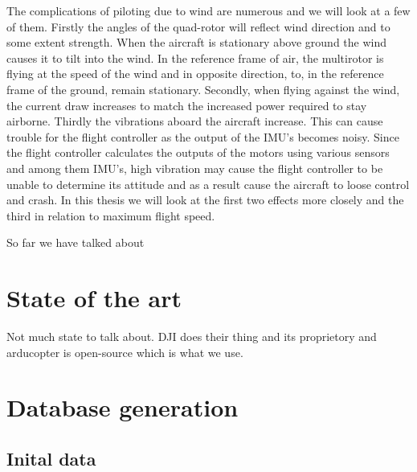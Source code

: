 \documentclass[12pt,oneside]{reedthesis}
\theoremstyle{definition}
\theoremstyle{definition}
\theoremstyle{definition}
\theoremstyle{remark}
\begin{document}
The complications of piloting due to wind are numerous and we will look
at a few of them. Firstly the angles of the quad-rotor will reflect wind
direction and to some extent strength. When the aircraft is stationary
above ground the wind causes it to tilt into the wind. In the reference
frame of air, the multirotor is flying at the speed of the wind and in
opposite direction, to, in the reference frame of the ground, remain
stationary. Secondly, when flying against the wind, the current draw
increases to match the increased power required to stay airborne.
Thirdly the vibrations aboard the aircraft increase. This can cause
trouble for the flight controller as the output of the IMU's becomes
noisy. Since the flight controller calculates the outputs of the motors
using various sensors and among them IMU's, high vibration may cause the
flight controller to be unable to determine its attitude and as a result
cause the aircraft to loose control and crash. In this thesis we will
look at the first two effects more closely and the third in relation to
maximum flight speed.

So far we have talked about

\chapter{State of the art}\label{state}

Not much state to talk about. DJI does their thing and its proprietory
and arducopter is open-source which is what we use.

\chapter{Database generation}\label{dbs}

\section{Inital data}\label{inital-data}
\end{document}

